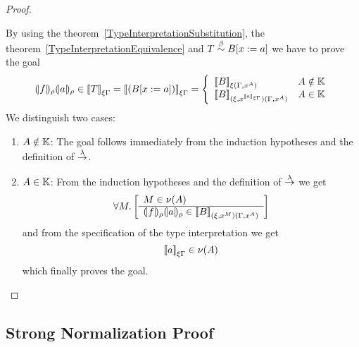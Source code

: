 \begin{theorem}
\begin{proof}
\begin{enumerate}
            By using the theorem~\ref{TypeInterpretationSubstitution}, the
            theorem~\ref{TypeInterpretationEquivalence} and $T
            \stackrel{\beta}{\sim} B[x:=a]$ we have to prove the goal
            $$
            \terminter{f}{\rho}
            \terminter{a}{\rho}
            \in
            \typeinter{T}{\xi\Gamma}
            =
            \typeinter{(B[x:=a])}{\xi\Gamma}
            =
            \left\{
                \begin{array}{ll}
                    \typeinter{B}{\xi(\Gamma,x^A)}
                    &
                    A \notin \Kinds
                    \\
                    \typeinter
                    {B}
                    {(\xi,x^{\typeinter{a}{\xi\Gamma}})(\Gamma,x^A)}
                    &
                    A \in \Kinds
                \end{array}
            \right.
            $$
            We distinguish two cases:
            \begin{enumerate}
            \item $A \notin \mathbb{K}$: The goal follows immediately from the
                induction hypotheses and the definition of $\stackrel{\lambda}{\to}$.

            \item $A \in \mathbb{K}$: From the induction hypotheses and the
                definition of $\stackrel{\lambda}{\to}$ we get
                $$
                    \forall M. \left[ \begin{array}{l} M \in \nu(A) \\ \hline 
                        {(\!|f|\!)_{\rho}}
                        {(\!|a|\!)_{\rho}}
                        \in
                        {{[\![}B{]\!]}}_{(\xi,x^M)(\Gamma,x^A)}
                    \end{array} \right]
                $$
                and from the specification of the type interpretation we get
                $$
                    {{[\![} a{]\!]}}_{\xi\Gamma} \in \nu(A)
                $$
                which finally proves the goal.
            \end{enumerate}
        \end{enumerate}
    \end{proof}
\end{theorem}





\subsection{Strong Normalization Proof}


